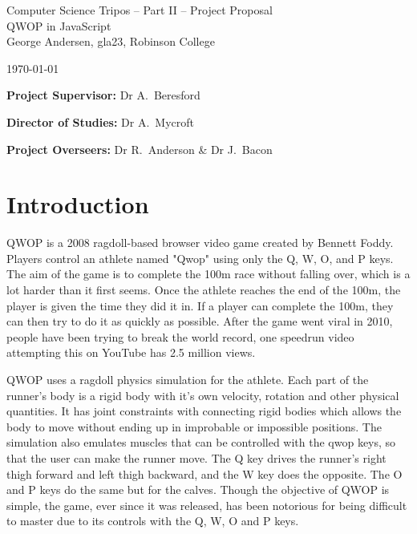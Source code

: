 \documentclass[12pt,a4paper,twoside]{article}
\begin{document}
\begin{center}
\Large
Computer Science Tripos -- Part II -- Project Proposal\\[4mm]
\LARGE
QWOP in JavaScript \\[4mm]

\large
George Andersen, gla23, Robinson College

\today

\end{center}

\vspace{5mm}

\textbf{Project Supervisor:} Dr A.~Beresford

\textbf{Director of Studies:} Dr A.~Mycroft

\textbf{Project Overseers:} Dr R.~Anderson \& Dr J.~Bacon


\section*{Introduction}

QWOP is a 2008 ragdoll-based browser video game created by Bennett Foddy. Players control an athlete named "Qwop" using only the Q, W, O, and P keys. The aim of the game is to complete the 100m race without falling over, which is a lot harder than it first seems. 
Once the athlete reaches the end of the 100m, the player is given the time they did it in. If a player can complete the 100m, they can then try to do it as quickly as possible. After the game went viral in 2010, people have been trying to break the world record, one speedrun video attempting this on YouTube has 2.5 million views.

QWOP uses a ragdoll physics simulation for the athlete. Each part of the runner's body is a rigid body with it's own velocity, rotation and other physical quantities. It has joint constraints with connecting rigid bodies which allows the body to move without ending up in improbable or impossible positions.
The simulation also emulates muscles that can be controlled with the qwop keys, so that the user can make the runner move. The Q key drives the runner's right thigh forward and left thigh backward, and the W key does the opposite. The O and P keys do the same but for the calves.
Though the objective of QWOP is simple, the game, ever since it was released, has been notorious for being difficult to master due to its controls with the Q, W, O and P keys.
\end{document}
